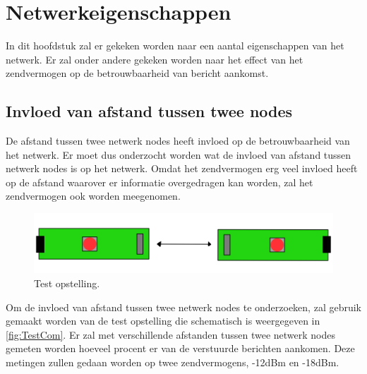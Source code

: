 \section{Netwerkeigenschappen}\label{sec:tests}
In dit hoofdstuk zal er gekeken worden naar een aantal eigenschappen van het netwerk. Er zal onder andere gekeken worden naar het effect van het zendvermogen op de betrouwbaarheid van bericht aankomst.

\subsection{Invloed van afstand tussen twee nodes} \label{sec:influenceOfDistanceOnNetwork}
De afstand tussen twee netwerk nodes heeft invloed op de betrouwbaarheid van het netwerk. Er moet dus onderzocht worden wat de invloed van afstand tussen netwerk nodes is op het netwerk. Omdat het zendvermogen erg veel invloed heeft op de afstand waarover er informatie overgedragen kan worden, zal het zendvermogen ook worden meegenomen.

\begin{figure}[h]
    \centering
    \includegraphics[scale = 0.3]{img/test1.png}
    \caption{Test opstelling.}
    \label{fig:TestCom}
\end{figure}
Om de invloed van afstand tussen twee netwerk nodes te onderzoeken, zal gebruik gemaakt worden van de test opstelling die schematisch is weergegeven in \autoref{fig:TestCom}. Er zal met verschillende afstanden tussen twee netwerk nodes gemeten worden hoeveel procent er van de verstuurde berichten aankomen. Deze metingen zullen gedaan worden op twee zendvermogens, -12dBm en -18dBm.

